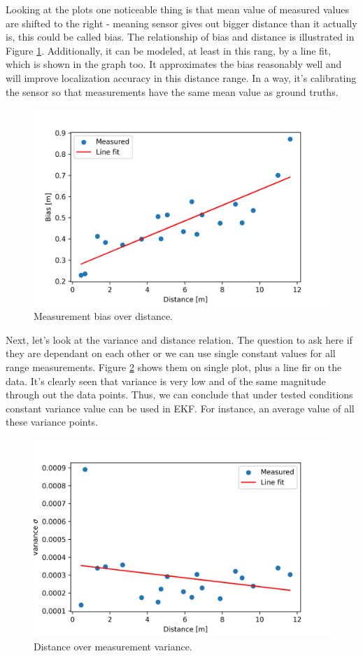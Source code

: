 Looking at the plots one noticeable thing is that mean value of measured values are shifted to the right - meaning sensor gives out bigger distance than it actually is, this could be called bias. The relationship of bias and distance is illustrated in Figure \ref{fig:distance_bias}. Additionally, it can be modeled, at least in this rang,  by a line fit, which is shown in the graph too. It approximates the bias reasonably well and will improve localization accuracy in this distance range. In a way, it's calibrating the sensor so that measurements have the same mean value as ground truths.
\begin{figure}
    \includegraphics[width=\linewidth]{figures/distance_bias.png}
    \caption{Measurement bias over distance.}
    \label{fig:distance_bias}
\end{figure}

Next, let's look at the variance and distance relation. The question to ask here if they are dependant on each other or we can use single constant values for all range measurements. Figure \ref{fig:distance_var} shows them on single plot, plus a line fir on the data. It's clearly seen that variance is very low and of the same magnitude through out the data points. Thus, we can conclude that under tested conditions constant variance value can be used in EKF. For instance, an average value of all these variance points.
\begin{figure}
    \centering
    \includegraphics[width=\linewidth]{figures/dist_variance.png}
    \caption{Distance over measurement variance.}
    \label{fig:distance_var}
\end{figure}